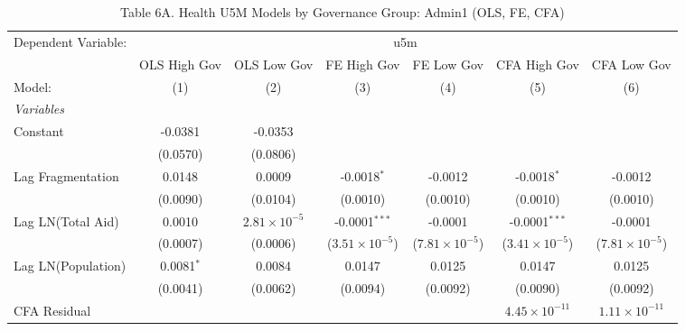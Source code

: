\begin{table}[H]
   \caption{Table 6A. Health U5M Models by Governance Group: Admin1 (OLS, FE, CFA)}
   \centering
   \begin{tabular}{lcccccc}
      \tabularnewline \midrule \midrule
      Dependent Variable: & \multicolumn{6}{c}{u5m}\\
                         & OLS High Gov & OLS Low Gov           & FE High Gov             & FE Low Gov              & CFA High Gov             & CFA Low Gov \\   
      Model:             & (1)          & (2)                   & (3)                     & (4)                     & (5)                      & (6)\\  
      \midrule
      \emph{Variables}\\
      Constant           & -0.0381      & -0.0353               &                         &                         &                          &   \\   
                         & (0.0570)     & (0.0806)              &                         &                         &                          &   \\   
      Lag Fragmentation  & 0.0148       & 0.0009                & -0.0018$^{*}$           & -0.0012                 & -0.0018$^{*}$            & -0.0012\\   
                         & (0.0090)     & (0.0104)              & (0.0010)                & (0.0010)                & (0.0010)                 & (0.0010)\\   
      Lag LN(Total Aid)  & 0.0010       & $2.81\times 10^{-5}$  & -0.0001$^{***}$         & -0.0001                 & -0.0001$^{***}$          & -0.0001\\   
                         & (0.0007)     & (0.0006)              & ($3.51\times 10^{-5}$)  & ($7.81\times 10^{-5}$)  & ($3.41\times 10^{-5}$)   & ($7.81\times 10^{-5}$)\\    
      Lag LN(Population) & 0.0081$^{*}$ & 0.0084                & 0.0147                  & 0.0125                  & 0.0147                   & 0.0125\\   
                         & (0.0041)     & (0.0062)              & (0.0094)                & (0.0092)                & (0.0090)                 & (0.0092)\\   
      CFA Residual       &              &                       &                         &                         & $4.45\times 10^{-11}$    & $1.11\times 10^{-11}$\\    

\end{tabular}
\end{table}
